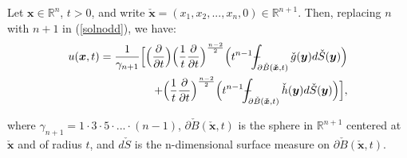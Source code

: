\documentclass[a4paper, 12pt]{article}
\def\Xint#1{\mathchoice
{\XXint\displaystyle\textstyle{#1}}%
{\XXint\textstyle\scriptstyle{#1}}%
{\XXint\scriptstyle\scriptscriptstyle{#1}}%
{\XXint\scriptscriptstyle\scriptscriptstyle{#1}}%
\!\int}
\def\XXint#1#2#3{{\setbox0=\hbox{$#1{#2#3}{\int}$ }
\vcenter{\hbox{$#2#3$ }}\kern-.6\wd0}}
\def\dashint{\Xint-}
\numberwithin{equation}{section}
\begin{document}
Let $\boldsymbol{x} \in \mathbb{R}^n$, $t>0$, and write
$\check{\boldsymbol{x}}=(x_1, x_2, ..., x_n, 0) \in \mathbb{R}^{n+1}$. Then,
replacing $n$ with $n+1$ in (\ref{solnodd}), we have:
\begin{equation} \label{solneven}
   \begin{split}
        u(\boldsymbol{x}, t)=\frac{1}{\gamma_{n+1}}\Big[\Big(\diffp[1]{}{t}\Big)  \Big(\frac{1}{t} \diffp[1]{}{t} \Big)^{\frac{n-2}{2}}\Big(t^{n-1} \dashint_{\partial \check{B}(\boldsymbol{\check{x}},t)}\check{g}(\boldsymbol{y})d\check{S}(\boldsymbol{y}) \Big)\\
        + \Big(\frac{1}{t} \diffp[1]{}{t} \Big)^{\frac{n-2}{2}}\Big(t^{n-1} \dashint_{\partial \check{B}(\boldsymbol{\check{x}},t)}\check{h}(\boldsymbol{y})d\check{S}(\boldsymbol{y}) \Big)\Big],
   \end{split}
\end{equation} 

 where $\gamma_{n+1}=1 \cdot 3 \cdot 5 \cdot ... \cdot (n-1)$, $\partial
 \check{B}(\boldsymbol{\check{x}},t)$ is the sphere in $\mathbb{R}^{n+1}$
 centered at $\boldsymbol{\check{x}}$ and of radius $t$, and $d\check{S}$ is the
 n-dimensional surface measure on $\partial
 \check{B}(\boldsymbol{\check{x}},t)$. \\
 
\end{document}
